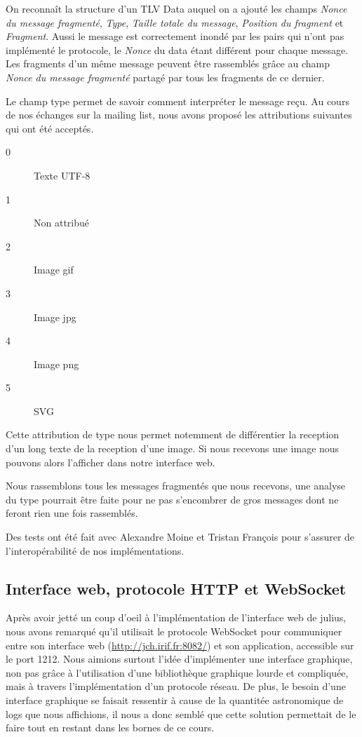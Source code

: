 \documentclass[a4paper,10pt]{article} %
\begin{document}
On reconnaît la structure d'un TLV Data auquel on a ajouté les champs \textit{Nonce du message fragmenté}, \textit{Type}, \textit{Taille totale du message}, \textit{Position du fragment} et \textit{Fragment}. Aussi le message est correctement inondé par les pairs qui n'ont pas implémenté le protocole, le \textit{Nonce} du data étant différent pour chaque message. Les fragments d'un même message peuvent être rassemblés grâce au champ \textit{Nonce du message fragmenté} partagé par tous les fragments de ce dernier.

Le champ type permet de savoir comment interpréter le message reçu. Au cours de nos échanges sur la mailing list, nous avons proposé les attributions suivantes qui ont été acceptés.

\begin{description}
\item[0] Texte UTF-8
\item[1] Non attribué
\item[2] Image gif
\item[3] Image jpg
\item[4] Image png
\item[5] SVG
\end{description}

Cette attribution de type nous permet notemment de différentier la reception d'un long texte de la reception d'une image. Si nous recevons une image nous pouvons alors l'afficher dans notre interface web.

Nous rassemblons tous les messages fragmentés que nous recevons, une analyse du type pourrait être faite pour ne pas s'encombrer de gros messages dont ne feront rien une fois rassemblés.

Des tests ont été fait avec \textrm{Alexandre Moine} et \textrm{Tristan François} pour s'assurer de l'interopérabilité de nos implémentations.

\subsection{Interface web, protocole HTTP et WebSocket\label{sec:web}}

Après avoir jetté un coup d'oeil à l'implémentation de l'interface web de julius, nous avons remarqué qu'il utilisait le protocole WebSocket pour communiquer entre son interface web (\href{http://jch.irif.fr:8082/}{http://jch.irif.fr:8082/}) et son application, accessible sur le port 1212. Nous aimions surtout l'idée d'implémenter une interface graphique, non pas grâce à l'utilisation d'une bibliothèque graphique lourde et compliquée, mais à travers l'implémentation d'un protocole réseau. De plus, le besoin d'une interface graphique se faisait ressentir à cause de la quantitée astronomique de logs que nous affichions, il nous a donc semblé que cette solution permettait de le faire tout en restant dans les bornes de ce cours.\\
\end{document}
